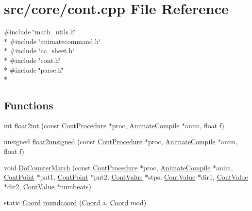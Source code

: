 \hypertarget{a00217}{\section{src/core/cont.cpp File Reference}
\label{a00217}
}
{\ttfamily \#include \char`\"{}math\-\_\-utils.\-h\char`\"{}}\\*
{\ttfamily \#include \char`\"{}animatecommand.\-h\char`\"{}}\\*
{\ttfamily \#include \char`\"{}cc\-\_\-sheet.\-h\char`\"{}}\\*
{\ttfamily \#include \char`\"{}cont.\-h\char`\"{}}\\*
{\ttfamily \#include \char`\"{}parse.\-h\char`\"{}}\\*
\subsection*{Functions}
\begin{DoxyCompactItemize}
\item 
int \hyperlink{a00217_a78cc623b4fb23380c6e615948086faed}{float2int} (const \hyperlink{a00067}{Cont\-Procedure} $\ast$proc, \hyperlink{a00007}{Animate\-Compile} $\ast$anim, float f)
\item 
unsigned \hyperlink{a00217_abe355d5879205abaf9443e717d853a43}{float2unsigned} (const \hyperlink{a00067}{Cont\-Procedure} $\ast$proc, \hyperlink{a00007}{Animate\-Compile} $\ast$anim, float f)
\item 
void \hyperlink{a00217_ac72876e87305850d66f3f0abb246a4fe}{Do\-Counter\-March} (const \hyperlink{a00067}{Cont\-Procedure} $\ast$proc, \hyperlink{a00007}{Animate\-Compile} $\ast$anim, \hyperlink{a00062}{Cont\-Point} $\ast$pnt1, \hyperlink{a00062}{Cont\-Point} $\ast$pnt2, \hyperlink{a00086}{Cont\-Value} $\ast$stps, \hyperlink{a00086}{Cont\-Value} $\ast$dir1, \hyperlink{a00086}{Cont\-Value} $\ast$dir2, \hyperlink{a00086}{Cont\-Value} $\ast$numbeats)
\item 
static \hyperlink{a00216_acd9dae57b712df0e2d3588c0c4798c11}{Coord} \hyperlink{a00217_aeb598692c11a6188d6cb68bd7060b46e}{roundcoord} (\hyperlink{a00216_acd9dae57b712df0e2d3588c0c4798c11}{Coord} a, \hyperlink{a00216_acd9dae57b712df0e2d3588c0c4798c11}{Coord} mod)
\end{DoxyCompactItemize}


